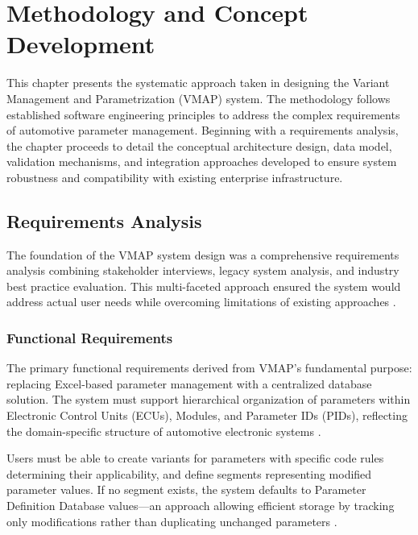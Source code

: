 \chapter{Methodology and Concept Development}
\label{chap:methodology}

This chapter presents the systematic approach taken in designing the Variant Management and Parametrization (VMAP) system. The methodology follows established software engineering principles to address the complex requirements of automotive parameter management. Beginning with a requirements analysis, the chapter proceeds to detail the conceptual architecture design, data model, validation mechanisms, and integration approaches developed to ensure system robustness and compatibility with existing enterprise infrastructure.

\section{Requirements Analysis}
\label{sec:requirements-analysis}

The foundation of the VMAP system design was a comprehensive requirements analysis combining stakeholder interviews, legacy system analysis, and industry best practice evaluation. This multi-faceted approach ensured the system would address actual user needs while overcoming limitations of existing approaches \cite{sommerville2011software}.

\subsection{Functional Requirements}
\label{subsec:functional-requirements}

The primary functional requirements derived from VMAP's fundamental purpose: replacing Excel-based parameter management with a centralized database solution. The system must support hierarchical organization of parameters within Electronic Control Units (ECUs), Modules, and Parameter IDs (PIDs), reflecting the domain-specific structure of automotive electronic systems \cite{staron2021automotive}. 

Users must be able to create variants for parameters with specific code rules determining their applicability, and define segments representing modified parameter values. If no segment exists, the system defaults to Parameter Definition Database values—an approach allowing efficient storage by tracking only modifications rather than duplicating unchanged parameters \cite{bhattacherjee2015principles}.

